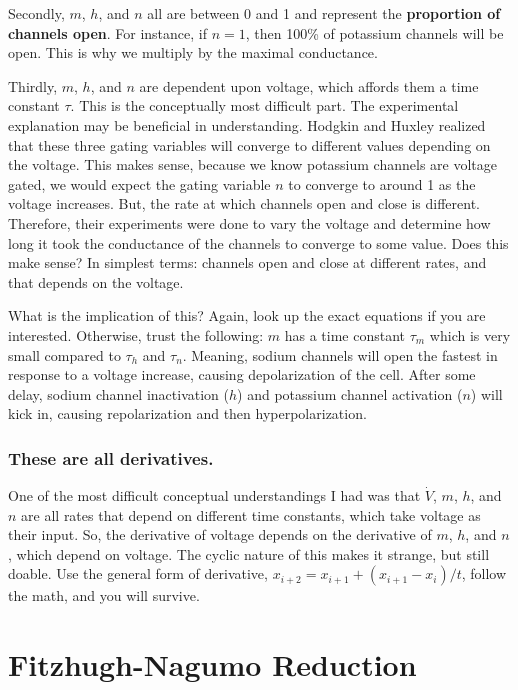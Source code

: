 Secondly, $m$, $h$, and $n$ all are between 0 and 1 and represent the \textbf{proportion of channels open}. For instance, if $n = 1$, then 100\% of potassium channels will be open. This is why we multiply by the maximal conductance.\newline

Thirdly, $m$, $h$, and $n$ are dependent upon voltage, which affords them a time constant $\tau$. This is the conceptually most difficult part. The experimental explanation may be beneficial in understanding. Hodgkin and Huxley realized that these three gating variables will converge to different values depending on the voltage. This makes sense, because we know potassium channels are voltage gated, we would expect the gating variable $n$ to converge to around 1 as the voltage increases. But, the rate at which channels open and close is different. Therefore, their experiments were done to vary the voltage and determine how long it took the conductance of the channels to converge to some value. Does this make sense? In simplest terms: channels open and close at different rates, and that depends on the voltage.\newline

What is the implication of this? Again, look up the exact equations if you are interested. Otherwise, trust the following: $m$ has a time constant $\tau_m$ which is very small compared to $\tau_h$ and $\tau_n$. Meaning, sodium channels will open the fastest in response to a voltage increase, causing depolarization of the cell. After some delay, sodium channel inactivation ($h$) and potassium channel activation ($n$) will kick in, causing repolarization and then hyperpolarization. 

\subsubsection{These are all derivatives.}
One of the most difficult conceptual understandings I had was that $\dot{V}$, $m$, $h$, and $n$ are all rates that depend on different time constants, which take voltage as their input. So, the derivative of voltage depends on the derivative of $m$, $h$, and $n$, which depend on voltage. The cyclic nature of this makes it strange, but still doable. Use the general form of derivative, $x_{i+2} = x_{i+1} + (x_{i+1} - x_i)/t$, follow the math, and you will survive.

\section{Fitzhugh-Nagumo Reduction}

